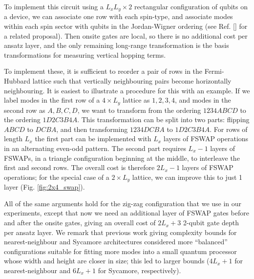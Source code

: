 \documentclass[aps,prb,twoside,superscriptaddress,longbibliography,nofootinbib,floatfix, notitlepage,twocolumn]{revtex4-1}
\begin{document}
To implement this circuit using a $L_xL_y \times 2$ rectangular configuration of qubits on a device, we can associate one row with each spin-type, and associate modes within each spin sector with qubits in the Jordan-Wigner ordering (see Ref. [] for a related proposal). Then onsite gates are local, so there is no additional cost per ansatz layer, and the only remaining long-range transformation is the basis transformations for measuring vertical hopping terms.

To implement these, it is sufficient to reorder a pair of rows in the Fermi-Hubbard lattice such that vertically neighbouring pairs become horizontally neighbouring. It is easiest to illustrate a procedure for this with an example. If we label modes in the first row of a $4 \times L_y$ lattice as $1,2,3,4$, and modes in the second row as $A,B,C,D$, we want to transform from the ordering $1234ABCD$ to the ordering $1D2C3B4A$. This transformation can be split into two parts: flipping $ABCD$ to $DCBA$, and then transforming $1234DCBA$ to $1D2C3B4A$. For rows of length $L_x$ the first part can be implemented with $L_x$ layers of FSWAP operations in an alternating even-odd pattern\cite{kivlichan18}. The second part requires $L_x-1$ layers of FSWAPs, in a triangle configuration beginning at the middle, to interleave the first and second rows. The overall cost is therefore $2L_x-1$ layers of FSWAP operations; for the special case of a $2\times L_y$ lattice, we can improve this to just 1 layer (Fig. \ref{fig:2x4_swap}).

All of the same arguments hold for the zig-zag configuration that we use in our experiments, except that now we need an additional layer of FSWAP gates before and after the onsite gates, giving an overall cost of $2L_x+3$ 2-qubit gate depth per ansatz layer. We remark that previous work giving complexity bounds for nearest-neighbour and Sycamore architectures\cite{cade20} considered more ``balanced'' configurations suitable for fitting more modes into a small quantum processor whose width and height are closer in size; this led to larger bounds ($4L_x+1$ for nearest-neighbour and $6L_x+1$ for Sycamore, respectively).
\end{document}
